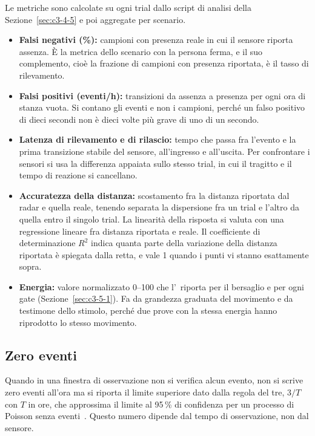 Le metriche sono calcolate su ogni trial dallo script di analisi della
Sezione~\ref{sec:c3-4-5} e poi aggregate per scenario.
\begin{itemize}
  \item \textbf{Falsi negativi (\%):} campioni con presenza reale in cui il sensore riporta
    assenza. È la metrica dello scenario con la persona ferma, e il suo complemento, cioè
    la frazione di campioni con presenza riportata, è il tasso di rilevamento.
  \item \textbf{Falsi positivi (eventi/h):} transizioni da assenza a presenza per ogni ora
    di stanza vuota. Si contano gli eventi e non i campioni, perché un falso positivo di
    dieci secondi non è dieci volte più grave di uno di un secondo.
  \item \textbf{Latenza di rilevamento e di rilascio:} tempo che passa fra l'evento e la
    prima transizione stabile del sensore, all'ingresso e all'uscita. Per confrontare i
    sensori si usa la differenza appaiata sullo stesso trial, in cui il tragitto e il
    tempo di reazione si cancellano.
  \item \textbf{Accuratezza della distanza:} scostamento fra la distanza riportata dal
    radar e quella reale, tenendo separata la dispersione fra un trial e l'altro da quella
    entro il singolo trial. La linearità della risposta si valuta con una regressione lineare fra distanza riportata e reale. Il coefficiente di determinazione $R^2$ indica quanta parte della variazione della distanza riportata è spiegata dalla retta, e vale 1 quando i punti vi stanno esattamente sopra.
  \item \textbf{Energia:} valore normalizzato 0--100 che l'\ldb\ riporta per il bersaglio e
    per ogni gate (Sezione~\ref{sec:c3-5-1}). Fa da grandezza graduata del movimento e da
    testimone dello stimolo, perché due prove con la stessa energia hanno riprodotto lo
    stesso movimento.
\end{itemize}

\subsection{Zero eventi}
\label{sec:metriche-zero}

Quando in una finestra di osservazione non si verifica alcun evento, non si scrive zero
eventi all'ora ma si riporta il limite superiore dato dalla regola del tre, $3/T$ con $T$
in ore, che approssima il limite al 95\,\% di confidenza per un processo di Poisson senza
eventi~\cite{hanley1983rule}. Questo numero dipende dal tempo di osservazione, non dal sensore.


